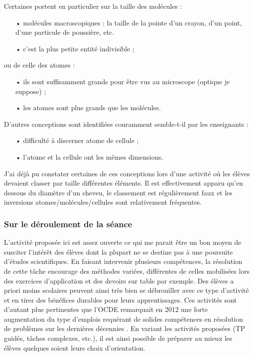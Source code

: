 \documentclass[12pt,a4paper]{article}
\begin{document}
Certaines portent en particulier sur la taille des molécules \cite{Griffiths1992} :
\begin{itemize}
\item[•] molécules \og macroscopiques \fg{} : la taille de la pointe d'un crayon, d'un point, d'une particule de poussière, etc. 
\item[•] c'est la plus petite entité indivisible ;
\end{itemize}
ou de celle des atomes :
\begin{itemize}
\item[•] ils sont suffisamment grands pour être vus au microscope (optique je suppose) ;
\item[•] les atomes sont plus grands que les molécules.
\end{itemize}

D'autres conceptions sont identifiées couramment semble-t-il par les enseignants :
\begin{itemize}
\item[•] difficulté à discerner atome de cellule ;
\item[•] l'atome et la cellule ont les mêmes dimensions.
\end{itemize}

J'ai déjà pu constater certaines de ces conceptions lors d'une activité où les élèves devaient classer par taille différentes éléments.
Il est effectivement apparu qu'en dessous du diamètre d'un cheveu, le classement est régulièrement faux et les inversions atomes/molécules/cellules sont relativement fréquentes.

\subsubsection{Sur le déroulement de la séance}

L'activité proposée ici est assez ouverte ce qui me parait être un bon moyen de susciter l'intérêt des élèves dont la plupart ne se destine pas à une poursuite d'études scientifiques.
En faisant intervenir plusieurs compétences, la résolution de cette tâche encourage des méthodes variées, différentes de celles mobilisées lors des exercices d'application et des devoirs sur table par exemple.
Des élèves a priori moins scolaires peuvent ainsi très bien se débrouiller avec ce type d'activité et en tirer des bénéfices durables pour leurs apprentissages.
Ces activités sont d'autant plus pertinentes que l'OCDE remarquait en 2012 \og une forte  augmentation du type d'emplois requérant de solides compétences en résolution de problèmes \fg{} sur les dernières décennies \cite{OCDE2012}.
En variant les activités proposées (TP guidés, tâches complexes, etc.), il est ainsi possible de préparer au mieux les élèves quelques soient leurs choix d'orientation.
\end{document}
